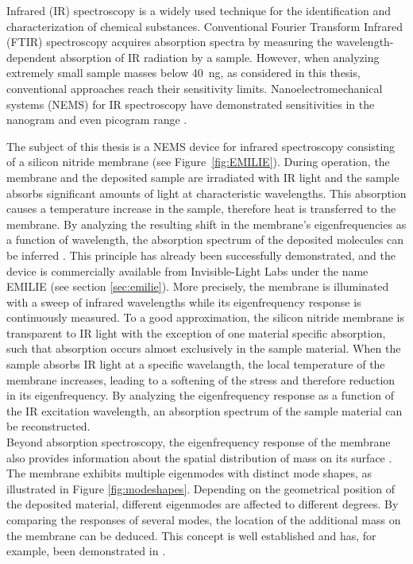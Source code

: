 Infrared (IR) spectroscopy is a widely used technique for the identification and characterization of chemical substances. Conventional Fourier Transform Infrared (FTIR) spectroscopy acquires absorption spectra by measuring the wavelength-dependent absorption of IR radiation by a sample. However, when analyzing extremely small sample masses below \SI{40}{\nano\gram}, as considered in this thesis, conventional approaches reach their sensitivity limits. Nanoelectromechanical systems (NEMS) for IR spectroscopy have demonstrated sensitivities in the nanogram and even picogram range \cite{Luhmann23}.

The subject of this thesis is a NEMS device for infrared spectroscopy consisting of a silicon nitride membrane (see Figure~\ref{fig:EMILIE}). During operation, the membrane and the deposited sample are irradiated with IR light and the sample absorbs significant amounts of light at characteristic wavelengths. This absorption causes a temperature increase in the sample, therefore heat is transferred to the membrane. By analyzing the resulting shift in the membrane’s eigenfrequencies as a function of wavelength, the absorption spectrum of the deposited molecules can be inferred \cite{Luhmann23}. This principle has already been successfully demonstrated, and the device is commercially available from Invisible-Light Labs under the name EMILIE \cite{Luhmann23,timaracpopovic25} (see section \ref{sec:emilie}). More precisely, the membrane is illuminated with a sweep of infrared wavelengths while its eigenfrequency response is continuously measured. To a good approximation, the silicon nitride membrane is transparent to IR light with the exception of one material specific absorption, such that absorption occurs almost exclusively in the sample material. When the sample absorbs IR light at a specific wavelangth, the local temperature of the membrane increases, leading to a softening of the stress and therefore reduction in its eigenfrequency. By analyzing the eigenfrequency response as a function of the IR excitation wavelength, an absorption spectrum of the sample material can be reconstructed.\\

Beyond absorption spectroscopy, the eigenfrequency response of the membrane also provides information about the spatial distribution of mass on its surface \cite{Hanay2012SingleproteinNM}. The membrane exhibits multiple eigenmodes with distinct mode shapes, as illustrated in Figure \ref{fig:modeshapes}. Depending on the geometrical position of the deposited material, different eigenmodes are affected to different degrees. By comparing the responses of several modes, the location of the additional mass on the membrane can be deduced. This concept is well established and has, for example, been demonstrated in \cite{Hanay2012SingleproteinNM}.\\


